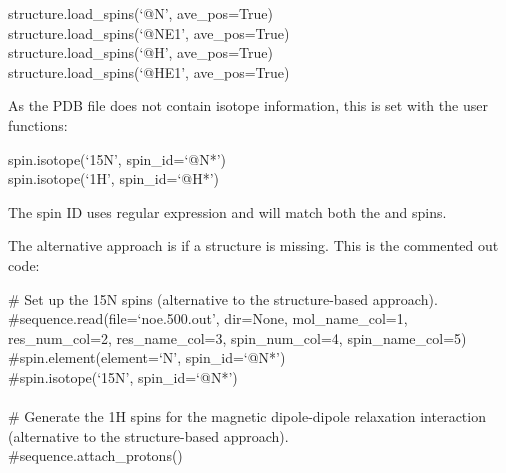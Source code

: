 \begin{htmlonly}
\begin{htmlonly}
\begin{exampleenv}
structure.load\_spins(`@N', ave\_pos=True) \\
structure.load\_spins(`@NE1', ave\_pos=True) \\
structure.load\_spins(`@H', ave\_pos=True) \\
structure.load\_spins(`@HE1', ave\_pos=True)
\end{exampleenv}

As the PDB file does not contain isotope information, this is set with the user functions:

\begin{exampleenv}
spin.isotope(`15N', spin\_id=`@N*') \\
spin.isotope(`1H', spin\_id=`@H*')
\end{exampleenv}

The spin ID  uses regular expression and will match both the  and  spins.

The alternative approach is if a structure is missing.  This is the commented out code:

\begin{exampleenv}
\# Set up the 15N spins (alternative to the structure-based approach). \\
\#sequence.read(file=`noe.500.out', dir=None, mol\_name\_col=1, res\_num\_col=2, res\_name\_col=3, spin\_num\_col=4, spin\_name\_col=5) \\
\#spin.element(element=`N', spin\_id=`@N*') \\
\#spin.isotope(`15N', spin\_id=`@N*') \\
 \\
\# Generate the 1H spins for the magnetic dipole-dipole relaxation interaction (alternative to the structure-based approach). \\
\#sequence.attach\_protons()
\end{exampleenv}


\end{htmlonly}
\end{htmlonly}
